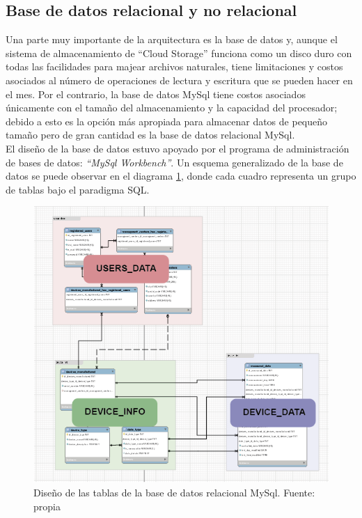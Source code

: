 \subsection{Base de datos relacional y no relacional}

Una parte muy importante de la arquitectura es la base de datos y, aunque el sistema de almacenamiento de ``Cloud Storage'' funciona como un disco duro con todas las facilidades para majear archivos naturales, tiene limitaciones y costos asociados al número de operaciones de lectura y escritura que se pueden hacer en el mes. Por el contrario, la base de datos MySql tiene costos asociados únicamente con el tamaño del almacenamiento y la capacidad del procesador; debido a esto es la opción más apropiada para almacenar datos de pequeño tamaño pero de gran cantidad es la base de datos relacional MySql.
\vspace{0.5cm}\\
El diseño de la base de datos estuvo apoyado por el programa de administración de bases de datos: \textsl{``MySql Workbench''}. Un esquema generalizado de la base de datos se puede observar en el diagrama \ref{fig_23}, donde cada cuadro representa un grupo de tablas bajo el paradigma SQL. 
\vspace{0.5cm}\\

\begin{figure}[htbp]
	\centerline{\includegraphics[width=14cm]{figuras/UML.png}}
	\caption{Diseño de las tablas de la base de datos relacional MySql. Fuente: propia}
	\label{fig_23}
\end{figure}

